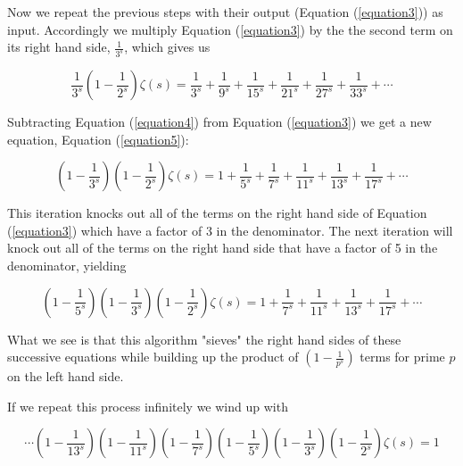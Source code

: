 \documentclass[11pt, oneside]{article}   	%
\begin{document}
\bigskip
\noindent
Now we repeat the previous steps with their output (Equation
(\ref{equation3})) as input.  Accordingly we multiply Equation
(\ref{equation3}) by the the second term on its right hand side,
$\frac{1}{3^s}$, which gives us

\bigskip
\begin{equation}
\frac {1}{3^{s}} \left (1 - \frac {1}{2^{s}} \right ) \zeta (s) =
\frac {1}{3^{s}} + \frac {1}{9^{s}} + \frac {1}{15^{s}} + \frac
{1}{21^{s}} + \frac {1}{27^{s}} + \frac {1}{33^{s}} + \cdots  
\label{equation4}
\end{equation}

\bigskip
\noindent
Subtracting Equation (\ref{equation4}) from Equation
(\ref{equation3}) we get a new equation, Equation
(\ref{equation5}):

\bigskip
\begin{equation}
\left ( 1 - \frac {1}{3^{s}} \right ) \left ( 1 - \frac
{1}{2^{s}} \right ) \zeta (s) = 1 + \frac {1}{5^{s}} + \frac
{1}{7^{s}} + \frac {1}{11^{s}} + \frac {1}{13^{s}} + \frac
{1}{17^{s}} + \cdots  
\label{equation5}
\end{equation}

\bigskip
\noindent
This iteration knocks out all of the terms on the right hand side
of Equation (\ref{equation3}) which have a factor of 3 in the
denominator. The next iteration will knock out all of the terms
on the right hand side that have a factor of 5 in the
denominator, yielding

\bigskip
\begin{equation*}
\left ( 1 - \frac {1}{5^{s}} \right )  \left ( 1 - \frac
{1}{3^{s}} \right ) \left ( 1 - \frac {1}{2^{s}} \right ) \zeta
(s) = 1 + \frac {1}{7^{s}} + \frac {1}{11^{s}} + \frac
{1}{13^{s}} + \frac {1}{17^{s}} + \cdots  
\end{equation*}

\medskip
\bigskip
\noindent
What we see is that this algorithm "sieves" the right hand sides
of these successive equations while building up the product of
$\left ( 1 - \frac{1}{p^{s}} \right)$ terms for prime $p$ on the
left hand side.

\bigskip
\noindent
If we repeat this process infinitely we wind up with  

\begin{equation*}
\cdots \left ( 1 - \frac {1}{13^{s}} \right ) \left ( 1 - \frac
{1}{11^{s}} \right ) \left ( 1 - \frac {1}{7^{s}} \right ) \left
( 1 - \frac {1}{5^{s}} \right )  \left ( 1 - \frac {1}{3^{s}}
\right ) \left ( 1 - \frac {1}{2^{s}} \right ) \zeta (s) = 1 
\end{equation*}
\end{document}
